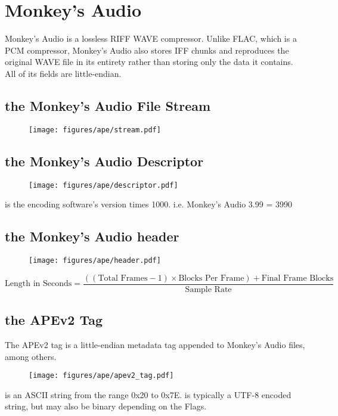 
\chapter{Monkey's Audio}
Monkey's Audio is a lossless RIFF WAVE compressor.
Unlike FLAC, which is a PCM compressor, Monkey's Audio also stores
IFF chunks and reproduces the original WAVE file in its entirety rather
than storing only the data it contains.
All of its fields are little-endian.

\section{the Monkey's Audio File Stream}
\begin{figure}[h]
\texttt{[image: figures/ape/stream.pdf]}
\end{figure}

\section{the Monkey's Audio Descriptor}
\begin{figure}[h]
\texttt{[image: figures/ape/descriptor.pdf]}
\end{figure}
\par
\noindent
{} is the encoding software's version times 1000.
i.e. Monkey's Audio 3.99 = 3990

\section{the Monkey's Audio header}
\begin{figure}[h]
\texttt{[image: figures/ape/header.pdf]}
\end{figure}
{
\begin{equation}
\text{Length in Seconds} = \frac{((\text{Total Frames} - 1) \times \text{Blocks Per Frame}) + \text{Final Frame Blocks}}{\text{Sample Rate}}
\end{equation}
}
\section{the APEv2 Tag}
\label{apev2}
The APEv2 tag is a little-endian metadata tag appended to
Monkey's Audio files, among others.
\begin{figure}[h]
\texttt{[image: figures/ape/apev2\_tag.pdf]}
\end{figure}
\par
\noindent
{} is an ASCII string from the range 0x20 to 0x7E.
 is typically a UTF-8 encoded string, but may
also be binary depending on the Flags.

